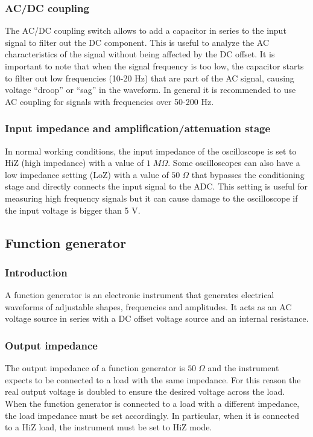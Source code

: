 \subsubsection*{AC/DC coupling}
The AC/DC coupling switch allows to add a capacitor in series to the input signal to filter out the DC component. This
is useful to analyze the AC characteristics of the signal without being affected by the DC offset. It is important to
note that when the signal frequency is too low, the capacitor starts to filter out low frequencies (10-20 Hz) that are
part of the AC signal, causing voltage ``droop'' or ``sag'' in the waveform. In general it is recommended to use AC coupling
for signals with frequencies over 50-200 Hz.

\subsubsection*{Input impedance and amplification/attenuation stage}
In normal working conditions, the input impedance of the oscilloscope is set to HiZ (high impedance) with a value of
\(1 \; M\Omega\). Some oscilloscopes can also have a low impedance setting (LoZ) with a value of \(50 \; \Omega\) that
bypasses the conditioning stage and directly connects the input signal to the ADC. This setting is useful for measuring
high frequency signals but it can cause damage to the oscilloscope if the input voltage is bigger than 5 V.

\subsection{Function generator}
\subsubsection*{Introduction}
A function generator is an electronic instrument that generates electrical waveforms of adjustable shapes, frequencies and
amplitudes. It acts as an AC voltage source in series with a DC offset voltage source and an internal resistance.

\subsubsection*{Output impedance}
The output impedance of a function generator is \(50 \; \Omega\) and the instrument expects to be connected to a load with
the same impedance. For this reason the real output voltage is doubled to ensure the desired voltage across the load. When
the function generator is connected to a load with a different impedance, the load impedance must be set accordingly. In
particular, when it is connected to a HiZ load, the instrument must be set to HiZ mode.

